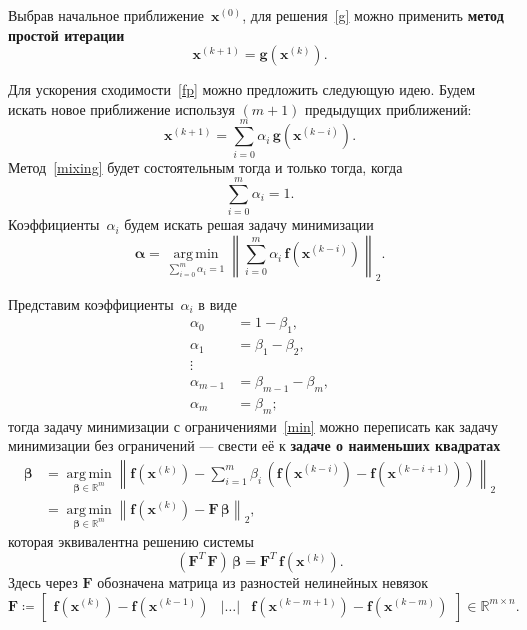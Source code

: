 \documentclass[a4paper, 14pt]{extarticle}
\DeclareMathOperator{\argmin}{arg\,min}
\newcommand{\vect}[1]{\boldsymbol{\mathbf{#1}}}
\begin{document}
	Выбрав начальное приближение~$\vect x^{(0)}$, для решения~\eqref{g} можно применить \textbf{метод простой итерации}
	\begin{equation}\label{fp}
		\vect x^{(k+1)} = \vect g(\vect x^{(k)}).
	\end{equation}
	
	Для ускорения сходимости~\eqref{fp} можно предложить следующую идею. Будем искать новое приближение используя $(m + 1)$ предыдущих приближений:
	\begin{equation}\label{mixing}
		\vect x^{(k+1)} = \sum_{i=0}^m \alpha_i\,\vect g(\vect x^{(k-i)}).
	\end{equation}
	Метод~\eqref{mixing} будет состоятельным тогда и только тогда, когда 
	\begin{equation*}
		\sum_{i=0}^m \alpha_i = 1.
	\end{equation*}
	Коэффициенты~$\alpha_i$ будем искать решая задачу минимизации
	\begin{equation}\label{min}
		\vect\alpha = \underset{\sum_{i=0}^m \alpha_i = 1}{\argmin} \left\lVert \sum_{i=0}^m \alpha_i\,\vect f(\vect x^{(k-i)}) \right\lVert_2.
	\end{equation}
	
	Представим коэффициенты~$\alpha_i$ в виде
	\begin{equation}\label{beta}
		\begin{aligned}
			\alpha_0		&= 1 - \beta_1, \\
			\alpha_1		&= \beta_1 - \beta_2, \\
			\vdots			& \\
			\alpha_{m-1}	&= \beta_{m-1} - \beta_m, \\
			\alpha_m		&= \beta_m;
		\end{aligned}
	\end{equation}
	тогда задачу минимизации с ограничениями~\eqref{min} можно переписать как задачу минимизации без ограничений --- свести её к \textbf{задаче о наименьших квадратах}
	\begin{equation}\label{lsq}
		\begin{aligned}
			\vect\beta 
				&= \underset{\vect\beta \in \mathbb R^m}{\argmin} \left\lVert \vect f(\vect x^{(k)}) - \sum_{i=1}^{m} \beta_i\,(\vect f(\vect x^{(k-i)}) - \vect f(\vect x^{(k-i+1)})) \right\lVert_2 \\
				&= \underset{\vect\beta \in \mathbb R^m}{\argmin} \left\lVert \vect f(\vect x^{(k)}) - \vect F\,\vect\beta \right\lVert_2, 
		\end{aligned}
	\end{equation}
	которая эквивалентна решению системы
	\begin{equation}\label{normal}
		\left(\vect F^T\,\vect F\right)\,\vect\beta = \vect F^T\,\vect f(\vect x^{(k)}).
	\end{equation}
	Здесь через $\vect F$ обозначена матрица из разностей нелинейных невязок
	$$
		\vect F \coloneqq \begin{bmatrix}
			\vect f(\vect x^{(k)}) - \vect f(\vect x^{(k-1)}) & | \dots | & \vect f(\vect x^{(k-m+1)}) - \vect f(\vect x^{(k-m)})
		\end{bmatrix} \in \mathbb R^{m \times n}.
	$$
	
\end{document}
